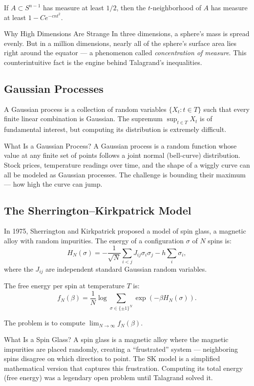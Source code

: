 If $A \subset S^{n-1}$ has measure at least $1/2$, then the $t$-neighborhood of $A$ has measure at least $1 - C e^{-c n t^2}$.

\begin{knowledgebridge}{Why High Dimensions Are Strange}
In three dimensions, a sphere's mass is spread evenly. But in a million dimensions, nearly all of the sphere's surface area lies right around the equator --- a phenomenon called \emph{concentration of measure}. This counterintuitive fact is the engine behind Talagrand's inequalities.
\end{knowledgebridge}

\subsection{Gaussian Processes}

A Gaussian process is a collection of random variables $\{X_t : t \in T\}$ such that every finite linear combination is Gaussian. The supremum $\sup_{t \in T} X_t$ is of fundamental interest, but computing its distribution is extremely difficult.

\begin{primer}{What Is a Gaussian Process?}
A Gaussian process is a random function whose value at any finite set of points follows a joint normal (bell-curve) distribution. Stock prices, temperature readings over time, and the shape of a wiggly curve can all be modeled as Gaussian processes. The challenge is bounding their maximum --- how high the curve can jump.
\end{primer}

\subsection{The Sherrington--Kirkpatrick Model}

In 1975, Sherrington and Kirkpatrick proposed a model of spin glass, a magnetic alloy with random impurities. The energy of a configuration $\sigma$ of $N$ spins is:
\[
H_N(\sigma) = -\frac{1}{\sqrt{N}} \sum_{i < j} J_{ij} \sigma_i \sigma_j - h \sum_i \sigma_i,
\]
where the $J_{ij}$ are independent standard Gaussian random variables.

The free energy per spin at temperature $T$ is:
\[
f_N(\beta) = \frac{1}{N} \log \sum_{\sigma \in \{\pm 1\}^N} \exp(-\beta H_N(\sigma)).
\]

The problem is to compute $\lim_{N \to \infty} f_N(\beta)$.

\begin{knowledgebridge}{What Is a Spin Glass?}
A spin glass is a magnetic alloy where the magnetic impurities are placed randomly, creating a ``frustrated'' system --- neighboring spins disagree on which direction to point. The SK model is a simplified mathematical version that captures this frustration. Computing its total energy (free energy) was a legendary open problem until Talagrand solved it.
\end{knowledgebridge}

